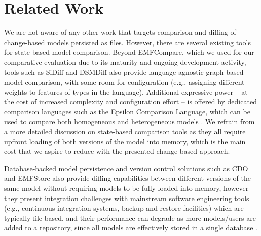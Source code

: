 \documentclass{jot}
\begin{document}
    \vspace{-11pt}
    \section{Related Work}
    \label{sec:related_work}
    We are not aware of any other work that targets comparison and diffing of change-based models persisted as files. However, there are several existing tools for state-based model comparison. Beyond EMFCompare, which we used for our comparative evaluation due to its maturity and ongoing development activity, tools such as SiDiff \cite{Treude2007SiDiff} and DSMDiff \cite{lin2009dsmdiff} also provide language-agnostic graph-based model comparison, with some room for configuration (e.g., assigning different weights to features of types in the language). Additional expressive power -- at the cost of increased complexity and configuration effort -- is offered by dedicated comparison languages such as the Epsilon Comparison Language, which can be used to compare both homogeneous and heterogeneous models \cite{kolovos2009ecl}. We refrain from a more detailed discussion on state-based comparison tools as they all require upfront loading of both versions of the model into memory, which is the main cost that we aspire to reduce with the presented change-based approach.
    
    
    Database-backed model persistence and version control solutions such as CDO \cite{eclipse2019cdo} and EMFStore \cite{koegel2010emfstore} also provide diffing capabilities between different versions of the same model without requiring models to be fully loaded into memory, however they present integration challenges with mainstream software engineering tools (e.g., continuous integration systems, backup and restore facilities) which are typically file-based, and their performance can degrade as more models/users are added to a repository, since all models are effectively stored in a single database \cite{KolovosRMPGCLRV13}.
    
\end{document}
